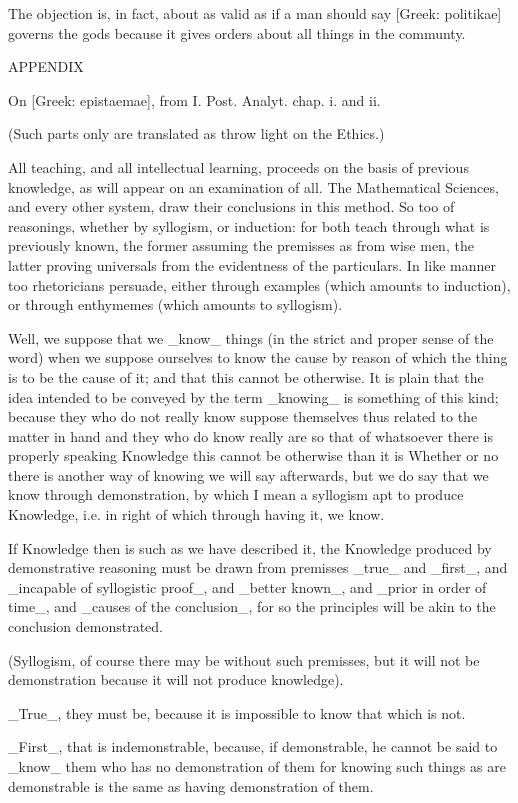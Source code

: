 The objection is, in fact, about as valid as if a man should say
[Greek: politikae] governs the gods because it gives orders about all
things in the communty.


APPENDIX

On [Greek: epistaemae], from I. Post. Analyt. chap. i. and ii.

(Such parts only are translated as throw light on the Ethics.)

All teaching, and all intellectual learning, proceeds on the basis
of previous knowledge, as will appear on an examination of all. The
Mathematical Sciences, and every other system, draw their conclusions in
this method. So too of reasonings, whether by syllogism, or induction:
for both teach through what is previously known, the former assuming
the premisses as from wise men, the latter proving universals from
the evidentness of the particulars. In like manner too rhetoricians
persuade, either through examples (which amounts to induction), or
through enthymemes (which amounts to syllogism).

Well, we suppose that we _know_ things (in the strict and proper sense
of the word) when we suppose ourselves to know the cause by reason
of which the thing is to be the cause of it; and that this cannot be
otherwise. It is plain that the idea intended to be conveyed by the term
_knowing_ is something of this kind; because they who do not really know
suppose themselves thus related to the matter in hand and they who
do know really are so that of whatsoever there is properly speaking
Knowledge this cannot be otherwise than it is Whether or no there is
another way of knowing we will say afterwards, but we do say that we
know through demonstration, by which I mean a syllogism apt to produce
Knowledge, i.e. in right of which through having it, we know.

If Knowledge then is such as we have described it, the Knowledge
produced by demonstrative reasoning must be drawn from premisses _true_
and _first_, and _incapable of syllogistic proof_, and _better known_,
and _prior in order of time_, and _causes of the conclusion_, for so the
principles will be akin to the conclusion demonstrated.

(Syllogism, of course there may be without such premisses, but it will
not be demonstration because it will not produce knowledge).

_True_, they must be, because it is impossible to know that which is not.

_First_, that is indemonstrable, because, if demonstrable, he cannot be
said to _know_ them who has no demonstration of them for knowing such
things as are demonstrable is the same as having demonstration of them.

